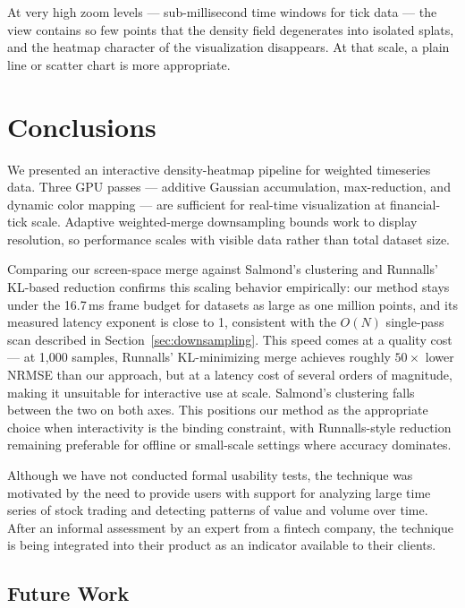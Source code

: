 \documentclass[10pt,conference]{IEEEtran}
\begin{document}
At very high zoom levels --- sub-millisecond time windows for tick data --- the view contains so few points that the density field degenerates into isolated splats, and the heatmap character of the visualization disappears. At that scale, a plain line or scatter chart is more appropriate.

\section{Conclusions}
\label{sec:conclusions}

We presented an interactive density-heatmap pipeline for weighted timeseries data. Three GPU passes --- additive Gaussian accumulation, max-reduction, and dynamic color mapping --- are sufficient for real-time visualization at financial-tick scale. Adaptive weighted-merge downsampling bounds work to display resolution, so performance scales with visible data rather than total dataset size.

Comparing our screen-space merge against Salmond's clustering and Runnalls' KL-based reduction confirms this scaling behavior empirically: our method stays under the 16.7\,ms frame budget for datasets as large as one million points, and its measured latency exponent is close to 1, consistent with the $O(N)$ single-pass scan described in Section~\ref{sec:downsampling}. This speed comes at a quality cost --- at 1{,}000 samples, Runnalls' KL-minimizing merge achieves roughly $50\times$ lower NRMSE than our approach, but at a latency cost of several orders of magnitude, making it unsuitable for interactive use at scale. Salmond's clustering falls between the two on both axes. This positions our method as the appropriate choice when interactivity is the binding constraint, with Runnalls-style reduction remaining preferable for offline or small-scale settings where accuracy dominates.

Although we have not conducted formal usability tests, the technique was motivated by the need to provide users with support for analyzing large time series of stock trading and detecting patterns of value and volume over time. After an informal assessment by an expert from a fintech company, the technique is being integrated into their product as an indicator available to their clients. 

\subsection{Future Work}
\end{document}
